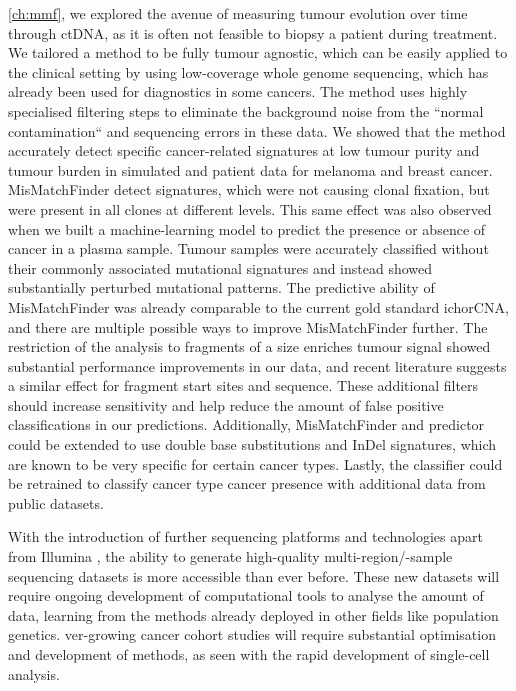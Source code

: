  \autoref{ch:mmf}, we explored the avenue of measuring tumour evolution over time through  ctDNA, as it is often not feasible to  biopsy a patient during treatment. We tailored a method to be fully tumour agnostic, which can be easily applied to the clinical setting by using low-coverage whole genome sequencing, which has already been used for diagnostics in some cancers. The method uses highly specialised filtering steps to eliminate the background noise from the ``normal contamination`` and sequencing errors in these data. We showed that the method  accurately detect specific cancer-related signatures at low tumour purity and tumour burden in simulated and patient data for melanoma and breast cancer. MisMatchFinder  detect signatures, which were not causing clonal fixation, but  were present in all clones at different levels. This same effect was also observed when we built a machine-learning model to predict the presence or absence of cancer in a plasma sample. Tumour samples were accurately classified without their commonly associated mutational signatures and instead showed substantially perturbed mutational patterns. The predictive ability of MisMatchFinder was already comparable to the current gold standard ichorCNA, and there are multiple possible ways to improve MisMatchFinder further. The restriction of the analysis to fragments of a size  enriches  tumour signal showed substantial performance improvements in our data, and recent literature suggests a similar effect for fragment start sites and sequence. These additional filters should increase sensitivity and help reduce the amount of false positive classifications in our predictions. Additionally, MisMatchFinder and predictor could be extended to use double base substitutions and InDel signatures, which are known to be very specific for certain cancer types. Lastly, the classifier could be retrained to classify cancer type  cancer presence with additional data from public datasets.

With the introduction of further sequencing platforms and technologies apart from Illumina \cite{SingularGenomics2021,UltimaGenomics2022,ElementBiosciences2022}, the ability to generate high-quality multi-region/-sample sequencing datasets is more accessible than ever before. These new datasets will require ongoing development of computational tools to analyse the amount of data, learning from the methods already deployed in other fields like population genetics. ver-growing cancer cohort studies will require substantial optimisation and development of methods, as  seen with the rapid development of single-cell analysis. 

